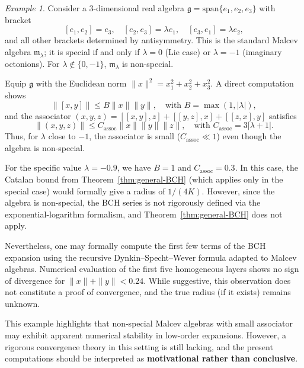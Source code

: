 \documentclass[11pt]{amsart}
\numberwithin{equation}{section}
\theoremstyle{remark}
\newtheorem{example}[theorem]{Example}
\begin{document}
\begin{example}\label{aA}
Consider a 3-dimensional real algebra $\mathfrak{g} = \mathrm{span}\{e_1,e_2,e_3\}$ with bracket
\[
[e_1,e_2] = e_3,\quad [e_2,e_3] = \lambda e_1,\quad [e_3,e_1] = \lambda e_2,
\]
and all other brackets determined by antisymmetry. This is the standard Malcev algebra $\mathfrak{m}_\lambda$; it is special if and only if $\lambda = 0$ (Lie case) or $\lambda = -1$ (imaginary octonions). For $\lambda \notin \{0,-1\}$, $\mathfrak{m}_\lambda$ is non-special.

Equip $\mathfrak{g}$ with the Euclidean norm $\|x\|^2 = x_1^2 + x_2^2 + x_3^2$. A direct computation shows
\[
\|[x,y]\| \leq B \|x\|\|y\|,\quad \text{with } B = \max(1,|\lambda|),
\]
and the associator $(x,y,z) = [[x,y],z] + [[y,z],x] + [[z,x],y]$ satisfies
\[
\|(x,y,z)\| \leq C_{\mathrm{assoc}} \|x\|\|y\|\|z\|,\quad \text{with } C_{\mathrm{assoc}} = 3|\lambda+1|.
\]
Thus, for $\lambda$ close to $-1$, the associator is small ($C_{\mathrm{assoc}} \ll 1$) even though the algebra is non-special.

For the specific value $\lambda = -0.9$, we have $B = 1$ and $C_{\mathrm{assoc}} = 0.3$. In this case, the Catalan bound from Theorem~\ref{thm:general-BCH} (which applies only in the special case) would formally give a radius of $1/(4K)$. However, since the algebra is non-special, the BCH series is not rigorously defined via the exponential-logarithm formalism, and Theorem~\ref{thm:general-BCH} does not apply.

Nevertheless, one may formally compute the first few terms of the BCH expansion using the recursive Dynkin–Specht–Wever formula adapted to Malcev algebras. Numerical evaluation of the first five homogeneous layers shows no sign of divergence for $\|x\| + \|y\| < 0.24$. While suggestive, this observation does not constitute a proof of convergence, and the true radius (if it exists) remains unknown.

This example highlights that non-special Malcev algebras with small associator may exhibit apparent numerical stability in low-order expansions. However, a rigorous convergence theory in this setting is still lacking, and the present computations should be interpreted as \textbf{motivational rather than conclusive}.
\end{example}
\end{document}
